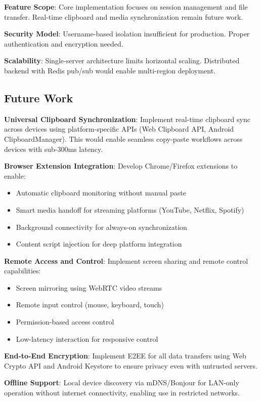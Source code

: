 \documentclass[conference]{IEEEtran}
\begin{document}
\textbf{Feature Scope}: Core implementation focuses on session management and file transfer. Real-time clipboard and media synchronization remain future work.

\textbf{Security Model}: Username-based isolation insufficient for production. Proper authentication and encryption needed.

\textbf{Scalability}: Single-server architecture limits horizontal scaling. Distributed backend with Redis pub/sub would enable multi-region deployment.

\subsection{Future Work}

\textbf{Universal Clipboard Synchronization}: Implement real-time clipboard sync across devices using platform-specific APIs (Web Clipboard API, Android ClipboardManager). This would enable seamless copy-paste workflows across devices with sub-300ms latency.

\textbf{Browser Extension Integration}: Develop Chrome/Firefox extensions to enable:
\begin{itemize}
    \item Automatic clipboard monitoring without manual paste
    \item Smart media handoff for streaming platforms (YouTube, Netflix, Spotify)
    \item Background connectivity for always-on synchronization
    \item Content script injection for deep platform integration
\end{itemize}

\textbf{Remote Access and Control}: Implement screen sharing and remote control capabilities:
\begin{itemize}
    \item Screen mirroring using WebRTC video streams
    \item Remote input control (mouse, keyboard, touch)
    \item Permission-based access control
    \item Low-latency interaction for responsive control
\end{itemize}

\textbf{End-to-End Encryption}: Implement E2EE for all data transfers using Web Crypto API and Android Keystore to ensure privacy even with untrusted servers.

\textbf{Offline Support}: Local device discovery via mDNS/Bonjour for LAN-only operation without internet connectivity, enabling use in restricted networks.
\end{document}
